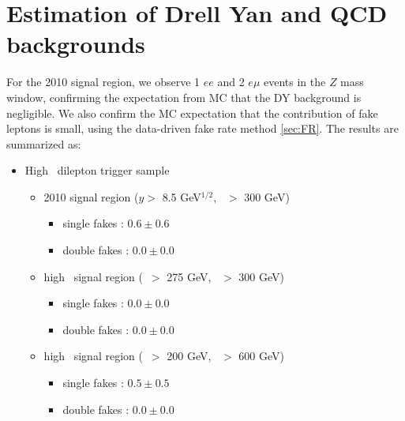 \section{Estimation of Drell Yan and QCD backgrounds}
\label{sec:dyFR}

For the 2010 signal region, we observe 1 $ee$ and 2 $e\mu$ events in the $Z$ mass window,
confirming the expectation from MC that the DY background is negligible. We also confirm 
the MC expectation that the contribution of fake leptons is small, using the data-driven fake
rate method \ref{sec:FR}. The results are summarized as:

\begin{itemize}
\item High \pt\ dilepton trigger sample
\begin{itemize}
\item 2010 signal region ($y >$ 8.5 GeV$^{1/2}$, \Ht\ $>$ 300 GeV)
   \begin{itemize} 
   \item single fakes : $0.6 \pm 0.6$
   \item double fakes : $0.0 \pm 0.0$
   \end{itemize}  
\item high \met\ signal region (\met\ $>$ 275 GeV, \Ht\ $>$ 300 GeV)
   \begin{itemize} 
   \item single fakes : $0.0 \pm 0.0$
   \item double fakes : $0.0 \pm 0.0$
   \end{itemize}  
\item high \Ht\ signal region (\met\ $>$ 200 GeV, \Ht\ $>$ 600 GeV)
   \begin{itemize} 
   \item single fakes : $0.5 \pm 0.5$
   \item double fakes : $0.0 \pm 0.0$
   \end{itemize}  
\end{itemize}

\clearpage


\end{itemize}
